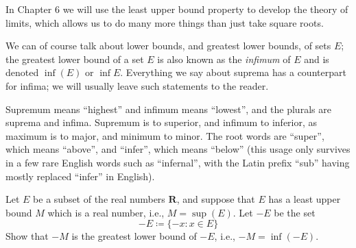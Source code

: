 \begin{remark}\label{5.5.14}
    In Chapter 6 we will use the least upper bound property to develop the theory of limits, which allows us to do many more things than just take square roots.
\end{remark}

\begin{remark}\label{5.5.15}
    We can of course talk about lower bounds, and greatest lower bounds, of sets \(E\);
    the greatest lower bound of a set \(E\) is also known as the \emph{infimum} of \(E\) and is denoted \(\inf(E)\) or \(\inf E\).
    Everything we say about suprema has a counterpart for infima;
    we will usually leave such statements to the reader.
\end{remark}

\begin{note}
    Supremum means ``highest'' and infimum means ``lowest'', and the plurals are suprema and infima.
    Supremum is to superior, and infimum to inferior, as maximum is to major, and minimum to minor.
    The root words are ``super'', which means ``above'', and ``infer'', which means ``below''
    (this usage only survives in a few rare English words such as ``infernal'', with the Latin prefix ``sub'' having mostly replaced ``infer'' in English).
\end{note}

\exercisesection

\begin{exercise}\label{ex 5.5.1}
    Let \(E\) be a subset of the real numbers \(\mathbf{R}\), and suppose that \(E\) has a least upper bound \(M\) which is a real number, i.e., \(M = \sup(E)\).
    Let \(-E\) be the set
    \[
        -E \coloneqq \{-x : x \in E\}
    \]
    Show that \(-M\) is the greatest lower bound of \(-E\), i.e., \(-M = \inf(-E)\).
\end{exercise}

